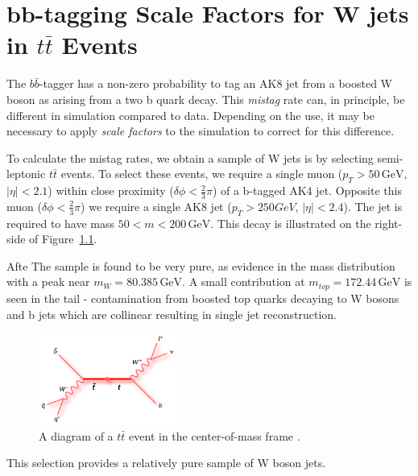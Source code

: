 \chapter{bb-tagging Scale Factors for W jets in $t\bar{t}$ Events}

The $b\bar{b}$-tagger has a non-zero probability to tag an AK8 jet from a boosted W boson as arising from a two b quark decay. This \textit{mistag} rate can, in principle, be different in simulation compared to data. Depending on the use, it may be necessary to apply \textit{scale factors} to the simulation to correct for this difference.

To calculate the mistag rates, we obtain a sample of W jets is by selecting semi-leptonic $t\bar{t}$ events. To select these events, we require a single muon ($p_{T}>50\,\textrm{GeV}$, $|\eta|<2.1$)  within close proximity ($\delta\phi < \frac{2}{3}\pi$) of a b-tagged AK4 jet. Opposite this muon ($\delta\phi<\frac{2}{3}\pi$) we require a single AK8 jet ($p_{T}>250 GeV$, $|\eta|<2.4$). The jet is required to have mass $50 < m < 200\,\textrm{GeV}$. This decay is illustrated on the right-side of Figure~\ref{fig:ttbar}. 

Afte
The sample is found to be very pure, as evidence in the mass distribution with a peak near $m_{W} = 80.385\,\textrm{GeV}$. A small contribution at $m_{top}=172.44\,\textrm{GeV}$ is seen in the tail - contamination from boosted top quarks decaying to W bosons and b jets which are collinear resulting in single jet reconstruction.

\begin{figure}[hbp!]
\centering
\includegraphics[width=0.4\textwidth]{figs/feynman_ttbar_ljets_beamline.png}
\caption[A  diagram of a $t\bar{t}$ event in the center-of-mass frame.]{A  diagram of a $t\bar{t}$ event in the center-of-mass frame \cite{ttbar}.}
\label{fig:ttbar}
\end{figure}

This selection provides a relatively pure sample of W boson jets.

